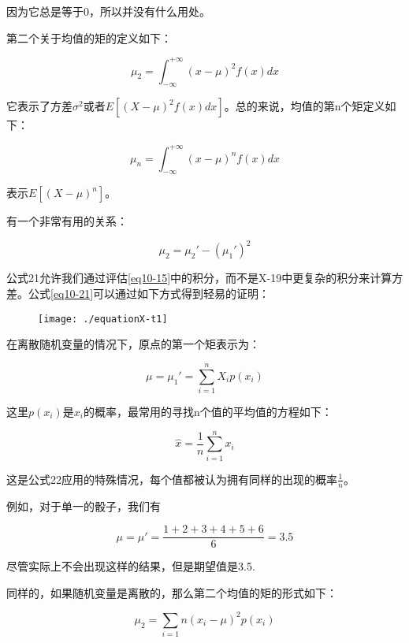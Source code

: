 \documentclass[cn,11pt,chinese]{elegantbook}
\begin{document}
{因为它总是等于0，所以并没有什么用处。

第二个关于均值的矩的定义如下：

\begin{equation}\label{eq10-19}
\mu_2=\int_{-\infty}^{+\infty}(x-\mu)^2f(x)dx
\end{equation}


它表示了方差$\sigma ^2$或者$E[(X-\mu)^2f(x)dx]$。总的来说，均值的第n个矩定义如下：

\begin{equation}\label{eq10-20}
\mu_n=\int_{-\infty}^{+\infty}(x-\mu)^nf(x)dx
\end{equation}


表示$E[(X-\mu)^n]$。

有一个非常有用的关系：

\begin{equation}\label{eq10-21}
\mu_2=\mu_2'-(\mu_1')^2 
\end{equation}



公式21允许我们通过评估\ref{eq10-15}中的积分，而不是X-19中更复杂的积分来计算方差。公式\ref{eq10-21}可以通过如下方式得到轻易的证明：


\begin{figure}
	\texttt{[image: ./equationX-t1]}
\end{figure}


在离散随机变量的情况下，原点的第一个矩表示为：

\begin{equation}\label{eq10-22}
\mu=\mu_1 ' =\sum_{i=1}^n X_i p(x_i)
\end{equation}


这里$p(x_i)$是$x_i$的概率，最常用的寻找n个值的平均值的方程如下：



$$\hat{x}=\frac{1}{n}\sum_{i=1}^n x_i   $$

这是公式22应用的特殊情况，每个值都被认为拥有同样的出现的概率$\frac{1}{n}$。

例如，对于单一的骰子，我们有

$$\mu=\mu '=\frac{1+2+3+4+5+6}{6}=3.5$$

尽管实际上不会出现这样的结果，但是期望值是3.5.

同样的，如果随机变量是离散的，那么第二个均值的矩的形式如下：

\begin{equation}\label{eq10-23}
\mu _2=\sum_{i=1}{n}(x_i-\mu)^2p(x_i) 
\end{equation}


}
\end{document}
